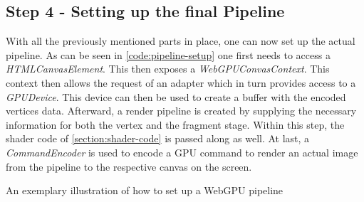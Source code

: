 \subsection{Step 4 - Setting up the final Pipeline}

With all the previously mentioned parts in place, one can now set up the actual pipeline. As can be seen in \ref*{code:pipeline-setup} one first needs to access a \emph{HTMLCanvasElement}. This 
then exposes a \emph{WebGPUConvasContext}. This context then allows the request of an adapter which in turn provides access to a \emph{GPUDevice}.
This device can then be used to create a buffer with the encoded vertices data. Afterward, a render pipeline is created by supplying the necessary information for both the vertex and the fragment stage.
Within this step, the shader code of \ref*{section:shader-code} is passed along as well. At last, a \emph{CommandEncoder} is used to encode a GPU command to render an actual image from the pipeline to the respective canvas on the screen. 

\begin{listing}

  \centering

  \caption[Code Snippet: WebGPU Pipeline]
  {
    An exemplary illustration of how to set up a WebGPU pipeline
  }
  \label{code:pipeline-setup}
\end{listing}

